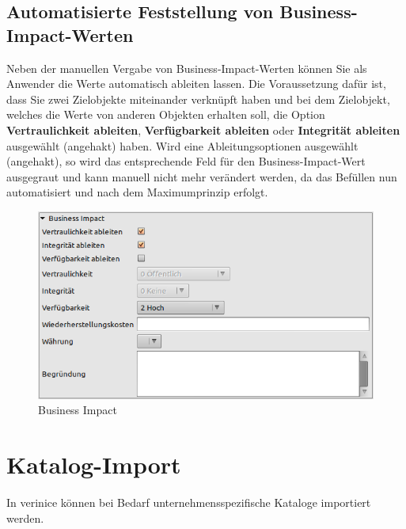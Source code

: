 \documentclass[a4paper,10pt]{book}
\begin{document}
\subsection{Automatisierte Feststellung von Business-Impact-Werten} \label{Automatisierte Feststellung von Business-Impact-Werten}
Neben der manuellen Vergabe von Business-Impact-Werten können Sie als Anwender die Werte automatisch ableiten lassen.
Die Voraussetzung dafür ist, dass Sie zwei Zielobjekte miteinander verknüpft haben und bei dem Zielobjekt, welches die Werte von anderen
Objekten erhalten soll, die Option \textbf{Vertraulichkeit ableiten}, \textbf{Verfügbarkeit ableiten} oder \textbf{Integrität ableiten} ausgewählt (angehakt) haben.
Wird eine Ableitungsoptionen ausgewählt (angehakt), so wird das entsprechende Feld für den Business-Impact-Wert ausgegraut und kann manuell
nicht mehr verändert werden, da das Befüllen nun automatisiert und nach dem Maximumprinzip erfolgt.
\newline
\begin{figure}[htb!]
  \centering
  \includegraphics[scale=.5]{Screenshot/Business_Impact.png}
  \caption{\label{Business Impact} Business Impact}
\end{figure}
\newline

\section{Katalog-Import}
In verinice können bei Bedarf unternehmensspezifische Kataloge importiert werden.
\end{document}
